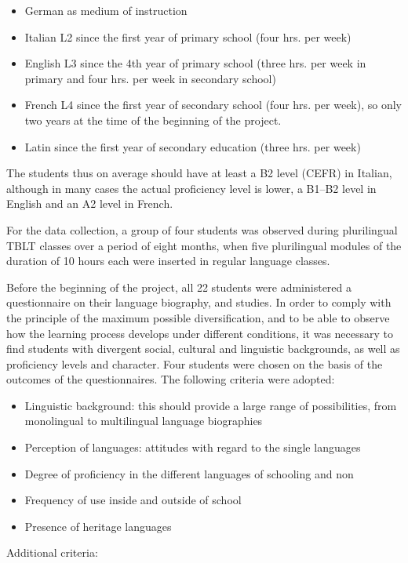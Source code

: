 \documentclass[output=paper]{../langscibook}
\begin{document}
\begin{itemize}[noitemsep]
\item German as medium of instruction
\item Italian L2 since the first year of primary school (four hrs. per week)
\item English L3 since the 4th year of primary school (three hrs. per week in primary and four hrs. per week in secondary school)
\item French L4 since the first year of secondary school (four hrs. per week), so only two years at the time of the beginning of the project. 
\item Latin since the first year of secondary education (three hrs. per week)
\end{itemize}

The students thus on average should have at least a B2 level (CEFR) in Italian, although in many cases the actual proficiency level is lower, a B1--B2 level in English and an A2 level in French. 

For the data collection, a group of four students was observed during plurilingual TBLT classes over a period of eight months, when five plurilingual modules of the duration of 10 hours each were inserted in regular language classes.  

Before the beginning of the project, all 22 students were administered a questionnaire on their language biography, and studies. In order to comply with the principle of the maximum possible diversification, and to be able to observe how the learning process develops under different conditions, it was necessary to find students with divergent social, cultural and linguistic backgrounds, as well as proficiency levels and character. Four students were chosen on the basis of the outcomes of the questionnaires. The following criteria were adopted:

\begin{itemize}[noitemsep]
\item Linguistic background: this should provide a large range of possibilities, from monolingual to multilingual language biographies
\item Perception of languages: attitudes with regard to the single languages
\item Degree of proficiency in the different languages of schooling and non 
\item Frequency of use inside and outside of school 
\item Presence of heritage languages
\end{itemize}
Additional criteria:
\end{document}
